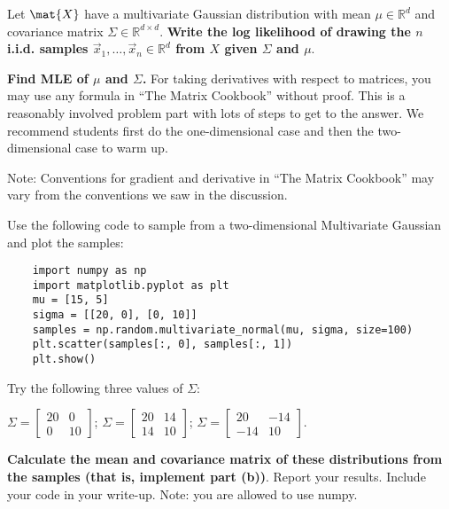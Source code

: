 \documentclass[preview]{standalone}
\begin{document}
\begin{Parts}

\Part Let $\mat{X}$ have a multivariate Gaussian distribution with mean
$\mu \in \mathbb{R}^d$ and covariance matrix $\Sigma \in \mathbb{R}^{d \times d}$.
{\bf Write the log likelihood of drawing the $n$ i.i.d. samples
$\vec{x}_1, \ldots, \vec{x}_n \in \mathbb{R}^d$ from $X$ given $\Sigma$ and $\mu$}.



\Part \textbf{Find MLE of $\mu$ and $\Sigma$.} For taking derivatives
with respect to matrices, you may use any formula in ``The Matrix
Cookbook'' without proof. This is a reasonably involved problem part
with lots of steps to get to the answer. We recommend students first
do the one-dimensional case and then the two-dimensional case to warm
up.

Note: Conventions for gradient and derivative in ``The Matrix Cookbook'' may
vary from the conventions we saw in the discussion.



\Part Use the following code to sample from a two-dimensional Multivariate Gaussian and plot the samples:
\begin{verbatim}
	import numpy as np
	import matplotlib.pyplot as plt
	mu = [15, 5]
	sigma = [[20, 0], [0, 10]]
	samples = np.random.multivariate_normal(mu, sigma, size=100)
	plt.scatter(samples[:, 0], samples[:, 1])
	plt.show()
\end{verbatim}
Try the following three values of $\Sigma$:

$\Sigma =
\begin{bmatrix}
20 & 0 \\
0 & 10
\end{bmatrix}
$; \quad
$\Sigma =
\begin{bmatrix}
20 & 14 \\
14 & 10
\end{bmatrix}
$; \quad
$\Sigma =
\begin{bmatrix}
20 & -14 \\
-14 & 10
\end{bmatrix}
$.

{\bf Calculate the mean and covariance matrix of these distributions from the samples
(that is, implement part (b))}. Report your results. Include your code in your write-up.
Note: you are allowed to use numpy.



\end{Parts}

\end{document}
